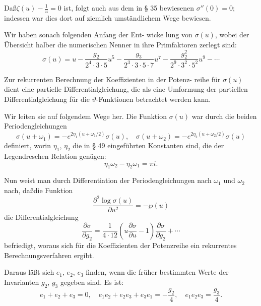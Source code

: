 \documentclass[12pt,a4paper]{article}
\theoremstyle{definition}
\begin{document}
Da\ss $\zeta(u) - \frac{1}{u} = 0$ ist, folgt auch aus dem in \S{} 35 bewiesenen
$\sigma''(0) = 0$; indessen war dies dort auf ziemlich umst\"{a}ndlichem
Wege bewiesen.

Wir haben sonach folgenden Anfang der Ent-
wicke lung von $\sigma(u)$, wobei der \"{U}bersicht halber die numerischen
Nenner in ihre Primfaktoren zerlegt sind:
\begin{equation}\tag{5}
\sigma(u) = u - \frac{g_2}{2^4 \cdot 3 \cdot 5}u^5 - \frac{g_3}{2^3 \cdot 3 \cdot 5 \cdot 7}u^7 - \frac{g_2^2}{2^9 \cdot 3^2 \cdot 5^2}u^9 - \cdots
\end{equation}

Zur rekurrenten Berechnung der Koeffizienten in der Potenz-
reihe f\"{u}r $\sigma(u)$ dient eine partielle Differentialgleichung, die als
eine Umformung der partiellen Differentialgleichung f\"{u}r die
$\vartheta$-Funktionen betrachtet werden kann.

Wir leiten sie auf folgendem Wege her. Die Funktion $\sigma(u)$
war durch die beiden Periodengleichungen
\begin{equation}\tag{6}
\sigma(u + \omega_1) = -e^{2\eta_1(u + \omega_1/2)}\sigma(u), \quad
\sigma(u + \omega_2) = -e^{2\eta_2(u + \omega_2/2)}\sigma(u)
\end{equation}
definiert, worin $\eta_1$, $\eta_2$ die in \S{} 49 eingef\"{u}hrten Konstanten
sind, die der Legendreschen Relation gen\"{u}gen:
\begin{equation}\tag{7}
\eta_1\omega_2 - \eta_2\omega_1 = \pi i.
\end{equation}

Nun weist man durch Differentiation der Periodengleichungen
nach $\omega_1$ und $\omega_2$ nach, da\ss die Funktion
\begin{equation}\tag{8}
\frac{\partial^2\log\sigma(u)}{\partial u^2} = -\wp(u)
\end{equation}
die Differentialgleichung
\begin{equation}\tag{9}
\frac{\partial\sigma}{\partial g_2} = \frac{1}{4\cdot 12}\left(u\frac{\partial\sigma}{\partial u} - 1\right)\frac{\partial\sigma}{\partial g_2} + \cdots
\end{equation}
befriedigt, woraus sich f\"{u}r die Koeffizienten der Potenzreihe
ein rekurrentes Berechnungsverfahren ergibt.

Daraus l\"{a}\ss t sich $e_1$, $e_2$, $e_3$ finden, wenn die fr\"{u}her
bestimmten Werte der Invarianten $g_2$, $g_3$ gegeben sind. Es ist:
\begin{equation}\tag{10}
e_1 + e_2 + e_3 = 0, \quad
e_1e_2 + e_2e_3 + e_3e_1 = -\frac{g_2}{4}, \quad
e_1e_2e_3 = \frac{g_3}{4}.
\end{equation}
\end{document}
